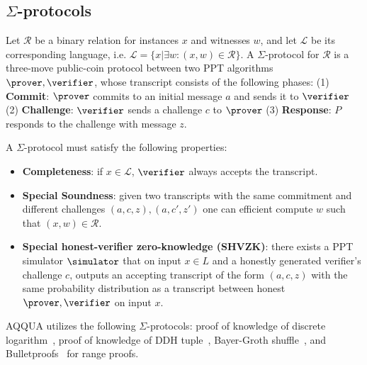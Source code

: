 \subsection{$\Sigma$-protocols}\label{subsec:sigma-protocols}

Let $\mathcal{R}$ be a binary relation for instances $x$ and witnesses $w$, and let $\mathcal{L}$ be its corresponding language, i.e. $\mathcal{L} = \{ x | \exists w: (x,w) \in \mathcal{R}\}$. A $\Sigma$-protocol for $\mathcal{R}$ is a three-move public-coin protocol between two PPT algorithms $\prover,\verifier$, whose transcript consists of the following phases: 
(1) \textbf{Commit}: $\prover$ commits to an initial message $a$ and sends it to $\verifier$ 
(2) \textbf{Challenge}: $\verifier$ sends a challenge $c$ to $\prover$ 
(3) \textbf{Response}: $P$ responds to the challenge with message $z$. 

A $\Sigma$-protocol must satisfy the following properties:
\begin{itemize}
    \item \textbf{Completeness}: if $x \in \mathcal{L}$, $\verifier$ always accepts the transcript.
    \item \textbf{Special Soundness}: given two transcripts with the same commitment and different challenges $(a,c,z), (a,c',z')$ one can efficient compute $w$ such that $(x,w) \in \mathcal{R}$.
    \item \textbf{Special honest-verifier zero-knowledge (SHVZK)}: there exists a PPT simulator $\simulator$ that on input $x \in L$ and a honestly generated verifier's challenge $c$, outputs an accepting transcript of the form $(a, c, z)$ with the same probability distribution as a transcript between honest $\prover,\verifier$ on input $x$.
\end{itemize}

AQQUA utilizes the following $\Sigma$-protocols:
proof of knowledge of discrete logarithm~\cite{fauzi2019quisquis}, proof of knowledge of DDH tuple~\cite{fauzi2019quisquis}, Bayer-Groth shuffle~\cite{Bayer-GrothShuffle},
and Bulletproofs~\cite{Bulletproofs} for range proofs.
